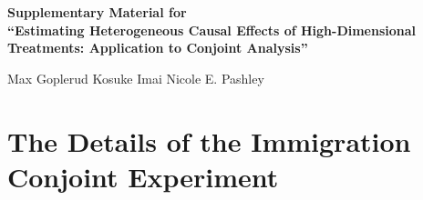 
\def\spacingset#1{\renewcommand{\baselinestretch}%
	{#1}\small\normalsize} \spacingset{1}

\appendix
\setcounter{page}{1}
\begin{center}
{\bf \Large  Supplementary Material for\\``Estimating Heterogeneous Causal Effects of
  High-Dimensional Treatments:  Application to Conjoint Analysis''}

\vspace{0.5cm}
{ \large Max Goplerud \hspace{.5in} Kosuke Imai \hspace{.5in} Nicole E. Pashley}
\end{center}

\setcounter{equation}{0}
\setcounter{figure}{0}
\setcounter{theorem}{0}
\setcounter{lemma}{0}
\setcounter{section}{0}
\setcounter{table}{0}
\renewcommand {\theequation} {A\arabic{equation}}
\renewcommand {\thefigure} {A\arabic{figure}}
\renewcommand {\thealgorithm} {A\arabic{algorithm}}
\renewcommand {\thetable} {A\arabic{table}}
\medskip 

\section{The Details of the Immigration Conjoint Experiment}
\label{app:conjoint}

